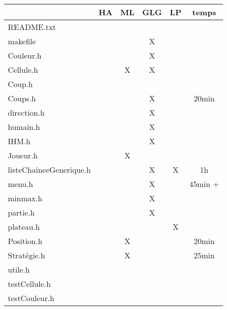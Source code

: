 
\begin{table}[h]
\centering
\begin{tabular}{l|c|c|c|c|c|}

\cline{2-6}
                                                        & HA & ML & GLG & LP & temps \\ \hline                                                                                                          
\multicolumn{1}{|l|}{README.txt}                        & \multicolumn{1}{l|}{} &               & \multicolumn{1}{l|}{} & \multicolumn{1}{l|}{} & \multicolumn{1}{l|}{}  \\ \hline
\multicolumn{1}{|l|}{makefile}&  &   & X    &    &     \\ \hline
\multicolumn{1}{|l|}{Couleur.h}&     &   & X    &      &      \\ \hline
\multicolumn{1}{|l|}{Cellule.h} &       &   X   &  X  &  &       \\ \hline
\multicolumn{1}{|l|}{Coup.h}&    &   &   &  &     \\ \hline
\multicolumn{1}{|l|}{Coups.h}&   &  &   X  &      &  20min  \\ \hline
\multicolumn{1}{|l|}{direction.h}&   &  &  X   &      &    \\ \hline
\multicolumn{1}{|l|}{humain.h}&   &  &  X   &      &    \\ \hline
\multicolumn{1}{|l|}{IHM.h}&   &  &  X   &      &    \\ \hline
\multicolumn{1}{|l|}{Joueur.h}&   & X  &    &     &    \\ \hline
\multicolumn{1}{|l|}{listeChaineeGenerique.h}&   &   &  X  &  X & 1h   \\ \hline
\multicolumn{1}{|l|}{menu.h}&   &   &  X  &   &  45min + \\ \hline
\multicolumn{1}{|l|}{minmax.h}&   &   &  X  &   &    \\ \hline
\multicolumn{1}{|l|}{partie.h}&   &   &  X  &   &    \\ \hline
\multicolumn{1}{|l|}{plateau.h}&   &   &    &  X &    \\ \hline
\multicolumn{1}{|l|}{Position.h}&   & X  &  &  &  20min \\ \hline
\multicolumn{1}{|l|}{Stratégie.h}&   &  X&    &   & 25min  \\ \hline
\multicolumn{1}{|l|}{utile.h}&   &   &    &   &    \\ \hline
\multicolumn{1}{|l|}{testCellule.h}&   &   &    &   &    \\ \hline
\multicolumn{1}{|l|}{testCouleur.h}&   &   &    &   &    \\ \hline

\end{tabular}
\end{table}
